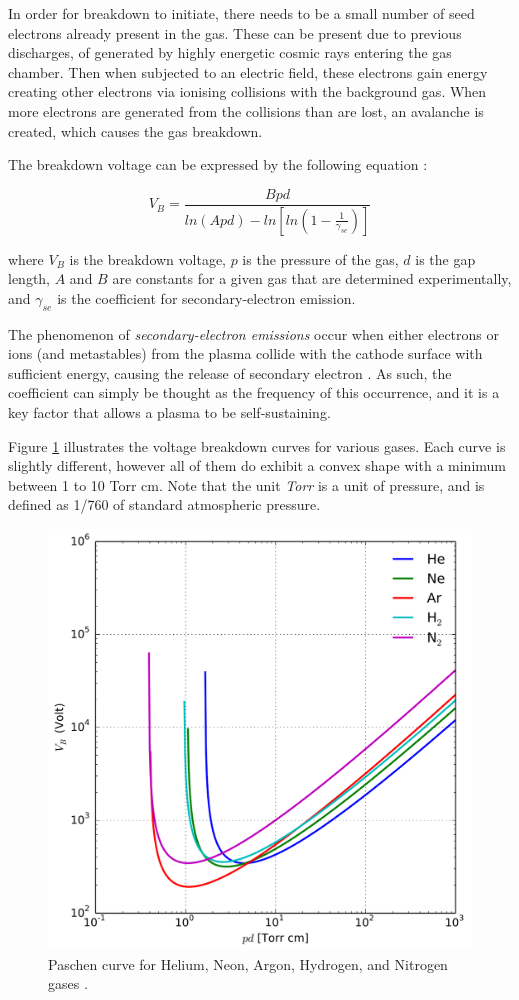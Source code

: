 In order for breakdown to initiate, there needs to be a small number of seed electrons already present in the gas. These can be present due to previous discharges, of generated by highly energetic cosmic rays entering the gas chamber. Then when subjected to an electric field, these electrons gain energy creating other electrons via ionising collisions with the background gas. When more electrons are generated from the collisions than are lost, an avalanche is created, which causes the gas breakdown.

The breakdown voltage can be expressed by the following equation \cite{Lieberman2005}:

\begin{equation}
	V_B = \frac{B p d}{ln(A p d) - ln[ln(1-\frac{1}{\gamma_{se}})]}
\end{equation}

where $V_B$ is the breakdown voltage, $p$ is the pressure of the gas, $d$ is the gap length, $A$ and $B$ are constants for a given gas that are determined experimentally, and $\gamma_{se}$ is the coefficient for secondary-electron emission. 

The phenomenon of \textit{secondary-electron emissions} occur when either electrons or ions (and metastables) from the plasma collide with the cathode surface with sufficient energy, causing the release of secondary electron \cite{Molnar1951, Sorokin2023}. As such, the coefficient can simply be thought as the frequency of this occurrence, and it is a key factor that allows a plasma to be self-sustaining. 

Figure \ref{fig:pashen_curve} illustrates the voltage breakdown curves for various gases. Each curve is slightly different, however all of them do exhibit a convex shape with a minimum between 1 to 10 Torr cm. Note that the unit \textit{Torr} is a unit of pressure, and is defined as 1/760 of standard atmospheric pressure. 

\begin{figure}[h!]
	\centering
	\includegraphics[width=0.75\linewidth]{chapter_2/figures/paschen_curve.png}
	\caption{Paschen curve for Helium, Neon, Argon, Hydrogen, and Nitrogen gases \cite{Lieberman2005}.}
	\label{fig:pashen_curve}
\end{figure}

